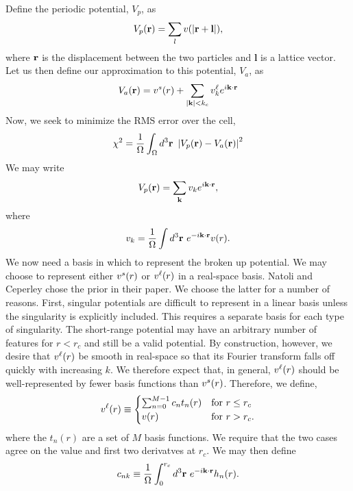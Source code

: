 \documentclass{article}
\begin{document}
Define the periodic potential, $V_p$, as 
\begin{equation}
V_p(\mathbf{r}) = \sum_l v(|\mathbf{r} + \mathbf{l}|),
\end{equation}
where $\mathbf{r}$ is the displacement between the two particles and
$\mathbf{l}$ is a lattice vector.  Let us then define our
approximation to this potential, $V_a$, as
\begin{equation}
V_a(\mathbf{r}) = v^s(r) + \sum_{|\mathbf{k}| < k_c} v^\ell_k e^{i\mathbf {\mathbf{k}} \cdot \mathbf{r}}
\end{equation}
Now, we seek to minimize the RMS error over the cell,
\begin{equation}
\chi^2 = \frac{1}{\Omega}\int_\Omega d^3 \mathbf{r} \ 
\left| V_p(\vr) - V_a(\vr)\right|^2 
\end{equation}
We may write
\begin{equation}
V_p(\mathbf{r}) = \sum_{\mathbf{k}} v_k e^{i \mathbf{k} \cdot \mathbf{r}},
\end{equation}
where 
\begin{equation}
v_k = \frac{1}{\Omega} \int d^3\mathbf{r} \ e^{-i\mathbf{k}\cdot\mathbf{r}}v(r).
\end{equation}
We now need a basis in which to represent the broken up potential.  We
may choose to represent either $v^s(r)$ or $v^\ell(r)$ in a real-space
basis.  Natoli and Ceperley chose the prior in their paper.  We choose
the latter for a number of reasons.  First, singular potentials are
difficult to represent in a linear basis unless the singularity is
explicitly included.  This requires a separate basis for each type of
singularity.  The short-range potential may have an arbitrary number
of features for $r<r_c$ and still be a valid potential.  By
construction, however, we desire that $v^\ell(r)$ be smooth in real-space
so that its Fourier transform falls off quickly with increasing $k$.
We therefore expect that, in general, $v^\ell(r)$ should be
well-represented by fewer basis functions than $v^s(r)$.  Therefore,
we define,
\begin{equation}
v^\ell(r) \equiv
\begin{cases}
 \sum_{n=0}^{M-1} c_n t_n(r) & \text{for } r \le r_c \\
 v(r) & \text{for } r > r_c.
\end{cases}
\end{equation}
where the $t_n(r)$ are a set of $M$ basis functions.  We require that
the two cases agree on the value and first two derivatves at $r_c$.
We may then define
\begin{equation}
c_{nk} \equiv \frac{1}{\Omega} \int_0^{r_c} d^3 \mathbf{r} \ e^{-i\mathbf{k}\cdot\mathbf{r}} h_n(r).
\end{equation}
\end{document}

